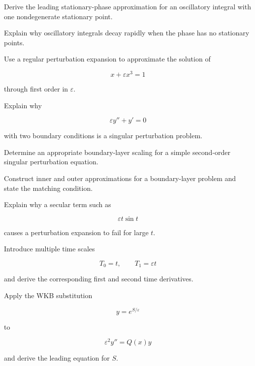 \begin{exercise}[3]
Derive the leading stationary-phase approximation for an oscillatory
integral with one nondegenerate stationary point.
\end{exercise}

\begin{exercise}[3]
Explain why oscillatory integrals decay rapidly when the phase has no
stationary points.
\end{exercise}

\begin{exercise}[3]
Use a regular perturbation expansion to approximate the solution of

\[
x+\varepsilon x^3=1
\]

through first order in \(\varepsilon\).
\end{exercise}

\begin{exercise}[3]
Explain why

\[
\varepsilon y''+y'=0
\]

with two boundary conditions is a singular perturbation problem.
\end{exercise}

\begin{exercise}[3]
Determine an appropriate boundary-layer scaling for a simple
second-order singular perturbation equation.
\end{exercise}

\begin{exercise}[3]
Construct inner and outer approximations for a boundary-layer problem and
state the matching condition.
\end{exercise}

\begin{exercise}[3]
Explain why a secular term such as

\[
\varepsilon t\sin t
\]

causes a perturbation expansion to fail for large \(t\).
\end{exercise}

\begin{exercise}[3]
Introduce multiple time scales

\[
T_0=t,
\qquad
T_1=\varepsilon t
\]

and derive the corresponding first and second time derivatives.
\end{exercise}

\begin{exercise}[3]
Apply the WKB substitution

\[
y=e^{S/\varepsilon}
\]

to

\[
\varepsilon^2y''=Q(x)y
\]

and derive the leading equation for \(S\).
\end{exercise}

